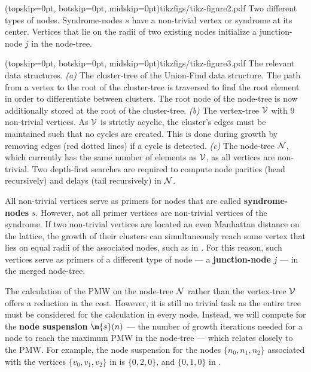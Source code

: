\Figure[htb](topskip=0pt, botskip=0pt, midskip=0pt){tikzfigs/tikz-figure2.pdf}{
    Two different types of nodes. Syndrome-nodes $s$ have a non-trivial vertex or syndrome at its center. Vertices that lie on the radii of two existing nodes initialize a junction-node $j$ in the node-tree.\label{fig2}}

\Figure[hbt](topskip=0pt, botskip=0pt, midskip=0pt){tikzfigs/tikz-figure3.pdf}{
    The relevant data structures. \emph{(a)} The cluster-tree of the Union-Find data structure. The path from a vertex to the root of the cluster-tree is traversed to find the root element in order to differentiate between clusters. The root node of the node-tree is now additionally stored at the root of the cluster-tree. \emph{(b)} The vertex-tree $\mathcal{V}$ with 9 non-trivial vertices. As $\mathcal{V}$ is strictly acyclic, the cluster's edges must be maintained such that no cycles are created. This is done during growth by removing edges (red dotted lines) if a cycle is detected. \emph{(c)} The node-tree $\mathcal{N}$, which currently has the same number of elements as $\mathcal{V}$, as all vertices are non-trivial. Two depth-first searches are required to compute node parities (head recursively) and delays (tail recursively) in $\mathcal{N}$.\label{fig3}}

All non-trivial vertices serve as primers for nodes that are called \textbf{syndrome-nodes} $s$. However, not all primer vertices are non-trivial vertices of the syndrome. If two non-trivial vertices are located an even Manhattan distance on the lattice, the growth of their clusters can simultaneously reach some vertex that lies on equal radii of the associated nodes, such as in . For this reason, such vertices serve as primers of a different type of node --- a \textbf{junction-node} $j$ --- in the merged node-tree. 

The calculation of the PMW on the node-tree $\mathcal{N}$ rather than the vertex-tree $\mathcal{V}$ offers a reduction in the cost. However, it is still no trivial task as the entire tree must be considered for the calculation in every node. Instead, we will compute for the \textbf{node suspension} $\m{s}(n)$ --- the number of growth iterations needed for a node to reach the maximum PMW in the node-tree --- which relates closely to the PMW. For example, the node suspension for the nodes $\{n_0, n_1, n_2\}$ associated with the vertices $\{v_0, v_1, v_2\}$ in  is $\{0, 2, 0\}$, and $\{0, 1, 0\}$ in .

